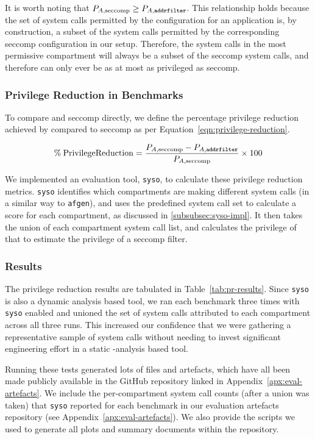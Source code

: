 It is worth noting that $P_{A, \text{seccomp}} \ge P_{A, \texttt{addrfilter}}$. This
relationship holds because the set of system calls permitted by the \af 
configuration for an application is, by construction, a subset of the system
calls permitted by the corresponding seccomp configuration in our setup.
Therefore, the system calls in the most permissive \af compartment will always
be a subset of the seccomp system calls, and therefore \af can only ever be as at
most as privileged as seccomp.

\subsubsection{Privilege Reduction in Benchmarks}

To compare \af and seccomp directly, we define the percentage privilege
reduction achieved by \af compared to seccomp as per 
Equation~\ref{eqn:privilege-reduction}.  

\begin{equation}\label{eqn:privilege-reduction}
    \% \: \mathrm{Privilege Reduction} = 
    \frac{P_{A, \text{seccomp}} - P_{A, \text{\texttt{addrfilter}}}}{P_{A, \text{seccomp}}} 
            \times 100
\end{equation}

We implemented an evaluation tool, \texttt{syso}, to calculate these privilege
reduction metrics. \texttt{syso} identifies which compartments are making
different system calls (in a similar way to \texttt{afgen}), and uses the
predefined system call set to calculate a score for each compartment, as
discussed in \ref{subsubsec:syso-impl}. It then takes the union of each
compartment system call list, and calculates the privilege of that to
estimate the privilege of a seccomp filter.

\subsubsection{Results}

The privilege reduction results are tabulated in Table~\ref{tab:pr-results}.
Since \texttt{syso} is also a dynamic analysis based tool, we ran each
benchmark three times with \texttt{syso} enabled and unioned the set of
system calls attributed to each compartment across all three runs. This
increased our confidence that we were gathering a representative sample of
system calls without needing to invest significant engineering effort in a static
-analysis based tool. 

Running these tests generated lots of files and artefacts, which have all been
made publicly available in the GitHub repository linked in 
Appendix~\ref{apx:eval-artefacts}. We include the per-compartment system call counts 
(after a union was taken) that \texttt{syso} reported for each benchmark in
our evaluation artefacts repository (see Appendix~\ref{apx:eval-artefacts}).
We also provide the scripts we used to generate all plots and summary documents
within the repository.

